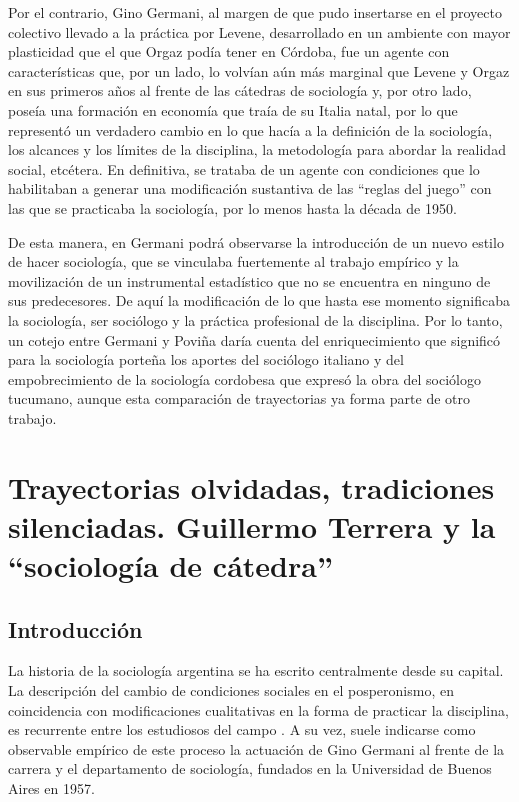 Por el contrario, Gino Germani, al margen de que pudo insertarse en el proyecto colectivo llevado a la práctica por Levene, desarrollado en un ambiente con mayor plasticidad que el que Orgaz podía tener en Córdoba, fue un agente con características que, por un lado, lo volvían aún más marginal que Levene y Orgaz en sus primeros años al frente de las cátedras de sociología y, por otro lado, poseía una formación en economía que traía de su Italia natal, por lo que representó un verdadero cambio en lo que hacía a la definición de la sociología, los alcances y los límites de la disciplina, la metodología para abordar la realidad social, etcétera. En definitiva, se trataba de un agente con condiciones que lo habilitaban a generar una modificación sustantiva de las \enquote{reglas del juego} con las que se practicaba la sociología, por lo menos hasta la década de 1950.

De esta manera, en Germani podrá observarse la introducción de un nuevo estilo de hacer sociología, que se vinculaba fuertemente al trabajo empírico y la movilización de un instrumental estadístico que no se encuentra en ninguno de sus predecesores. De aquí la modificación de lo que hasta ese momento significaba la sociología, ser sociólogo y la práctica profesional de la disciplina. Por lo tanto, un cotejo entre Germani y Poviña daría cuenta del enriquecimiento que significó para la sociología porteña los aportes del sociólogo italiano y del empobrecimiento de la sociología cordobesa que expresó la obra del sociólogo tucumano, aunque esta comparación de trayectorias ya forma parte de otro trabajo.

\chapter[Trayectorias olvidadas, tradiciones silenciadas. Guillermo Terrera y la \enquote{sociología de cátedra}]{Trayectorias olvidadas, tradiciones silenciadas. Guillermo Terrera y la \enquote{sociología de cátedra}}

\section{Introducción}

La historia de la sociología argentina se ha escrito centralmente desde su capital. La descripción del cambio de condiciones sociales en el posperonismo, en coincidencia con modificaciones cualitativas en la forma de practicar la disciplina, es recurrente entre los estudiosos del campo \parencite[entre otros]{1450-VERON1974,1508-SIDICARO1993,1550-BLOIS2018,1565-BLANCO2006}. A su vez, suele indicarse como observable empírico de este proceso la actuación de Gino Germani al frente de la carrera y el departamento de sociología, fundados en la Universidad de Buenos Aires en 1957.

